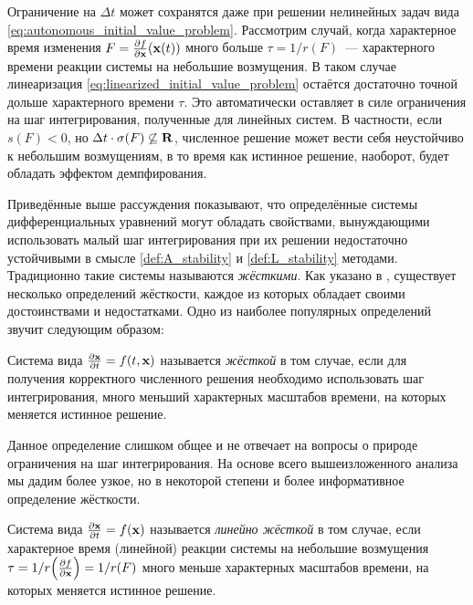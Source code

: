 Ограничение на $ \Delta t $ может сохранятся даже при решении нелинейных задач вида \eqref{eq:autonomous_initial_value_problem}.
Рассмотрим случай, когда характерное время изменения $ F = \frac{\partial f}{\partial \mathbf{x}}(\mathbf{x}(t)) $
много больше $ \tau = 1/r(F) $~--- характерного времени реакции системы на небольшие возмущения.
В таком случае линеаризация \eqref{eq:linearized_initial_value_problem} остаётся достаточно точной дольше характерного времени $ \tau $.
Это автоматически оставляет в силе ограничения на шаг интегрирования, полученные для линейных систем.
В частности, если $ s(F) < 0 $, но $ \Delta t \cdot \sigma(F) \not\subseteq \mathbf{R} $, численное решение может вести себя неустойчиво к небольшим возмущениям,
в то время как истинное решение, наоборот, будет обладать эффектом демпфирования.

Приведённые выше рассуждения показывают, что определённые системы дифференциальных уравнений могут обладать свойствами,
вынуждающими использовать малый шаг интегрирования при их решении недостаточно устойчивыми в смысле \ref{def:A_stability} и \ref{def:L_stability} методами.
Традиционно такие системы называются \emph{жёсткими}.
Как указано в \cite{heirer1999solvingode2, lambert1991methods}, существует несколько определений жёсткости,
каждое из которых обладает своими достоинствами и недостатками.
Одно из наиболее популярных определений звучит следующим образом:

\begin{definition}
    \label{def:stiffness}
    Система вида $ \frac{\partial \mathbf{x}}{\partial t} = f(t, \mathbf{x}) $ называется \emph{жёсткой} в том случае,
    если для получения корректного численного решения необходимо использовать шаг интегрирования,
    много меньший характерных масштабов времени, на которых меняется истинное решение.
\end{definition}

Данное определение слишком общее и не отвечает на вопросы о природе ограничения на шаг интегрирования.
На основе всего вышеизложенного анализа мы дадим более узкое, но в некоторой степени и более информативное определение жёсткости.

\begin{definition}
    \label{def:linear_stiffness}
    Система вида $ \frac{\partial \mathbf{x}}{\partial t} = f(\mathbf{x}) $ называется \emph{линейно жёсткой} в том случае,
    если характерное время (линейной) реакции системы на небольшие возмущения $ \tau = 1 / r \! \left( \frac{\partial f}{\partial \mathbf{x}} \right) = 1 / r(F) $
    много меньше характерных масштабов времени, на которых меняется истинное решение.
\end{definition}

